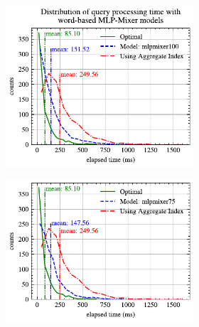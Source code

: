 \begin{figure}[!h]
	\centering
	\begin{subfigure}{0.45\textwidth}
		\begin{subfigure}{\textwidth}
			\centering
			\includegraphics[]{my/graphics/perf_dist_mlpmixer100_A.pdf}
		\end{subfigure}
		\vfill
		\begin{subfigure}{\textwidth}
			\centering
			\includegraphics[]{my/graphics/perf_dist_mlpmixer75_A.pdf}
		\end{subfigure}
		\vfill
		\begin{subfigure}{\textwidth}
			\centering

\end{subfigure}
\end{subfigure}
\end{figure}
